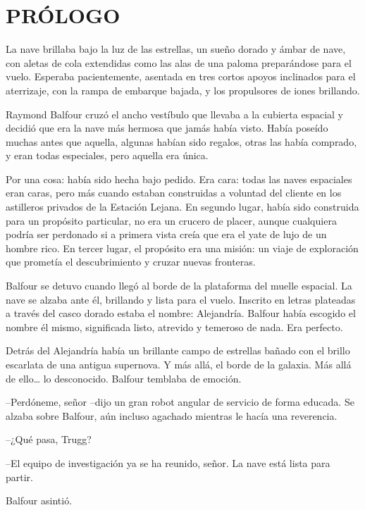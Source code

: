 \chapter*{PRÓLOGO}

{La nave brillaba bajo la luz de las estrellas, un sueño dorado y ámbar
 de nave, con aletas de cola extendidas como las alas de una paloma
 preparándose para el vuelo. Esperaba pacientemente, asentada en tres
 cortos apoyos inclinados para el aterrizaje, con la rampa de embarque
bajada, y los propulsores de iones brillando.}

{Raymond Balfour cruzó el ancho vestíbulo que llevaba a la cubierta
 espacial y decidió que era la nave más hermosa que jamás había visto.
 Había poseído muchas antes que aquella, algunas habían sido regalos,
 otras las había comprado, y eran todas especiales, pero aquella era
única.}

{Por una cosa: había sido hecha bajo pedido. Era cara: todas las naves
 espaciales eran caras, pero más cuando estaban construidas a voluntad
 del cliente en los astilleros privados de la Estación Lejana. En segundo
 lugar, había sido construida para un propósito particular, no era un
 crucero de placer, aunque cualquiera podría ser perdonado si a primera
 vista creía que era el yate de lujo de un hombre rico. En tercer lugar,
 el propósito era una misión: un viaje de exploración que prometía el
descubrimiento y cruzar nuevas fronteras.}

{Balfour se detuvo cuando llegó al borde de la plataforma del muelle
 espacial. La nave se alzaba ante él, brillando y lista para el vuelo.
 Inscrito en letras plateadas a través del casco dorado estaba el nombre:
 Alejandría. Balfour había escogido el nombre él mismo, significada
listo, atrevido y temeroso de nada. Era perfecto.}

{Detrás del Alejandría había un brillante campo de estrellas bañado con
 el brillo escarlata de una antigua supernova. Y más allá, el borde de la
 galaxia. Más allá de ello\ldots{} lo desconocido. Balfour temblaba de
emoción.}

{--Perdóneme, señor --dijo un gran robot angular de servicio de forma
 educada. Se alzaba sobre Balfour, aún incluso agachado mientras le hacía
una reverencia.}

{--¿Qué pasa, Trugg?}

{--El equipo de investigación ya se ha reunido, señor. La nave está lista
para partir.}

{Balfour asintió.}

